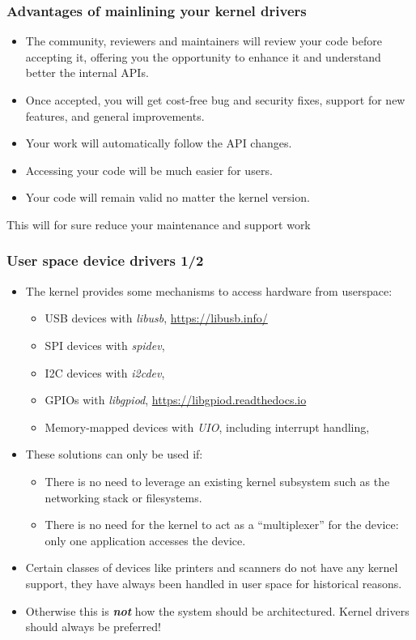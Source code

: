 \begin{frame}
  \frametitle{Advantages of mainlining your kernel drivers}
  \begin{itemize}
  \item The community, reviewers and maintainers will review your code
    before accepting it, offering you the opportunity to enhance it and
    understand better the internal APIs.
  \item Once accepted, you will get cost-free bug and security fixes,
    support for new features, and general improvements.
  \item Your work will automatically follow the API changes.
  \item Accessing your code will be much easier for users.
  \item Your code will remain valid no matter the kernel version.
  \end{itemize}
  This will for sure reduce your maintenance and support work
\end{frame}


\begin{frame}
  \frametitle{User space device drivers 1/2}
  \begin{itemize}
  \item The kernel provides some mechanisms to access hardware from userspace:
    \begin{itemize}
    \item USB devices with {\em libusb}, \url{https://libusb.info/}
    \item SPI devices with {\em spidev}, 
    \item I2C devices with {\em i2cdev}, 
    \item GPIOs with {\em libgpiod}, \url{https://libgpiod.readthedocs.io}
    \item Memory-mapped devices with {\em UIO}, including interrupt
      handling, 
    \end{itemize}
  \item These solutions can only be used if:
    \begin{itemize}
    \item There is no need to leverage an existing kernel subsystem
      such as the networking stack or filesystems.
    \item There is no need for the kernel to act as a ``multiplexer''
      for the device: only one application accesses the device.
    \end{itemize}
  \item Certain classes of devices like printers and scanners do not
    have any kernel support, they have always been handled in user space
    for historical reasons.
  \item Otherwise this is {\bf \em not} how the system should be
    architectured. Kernel drivers should always be preferred!
  \end{itemize}
\end{frame}

